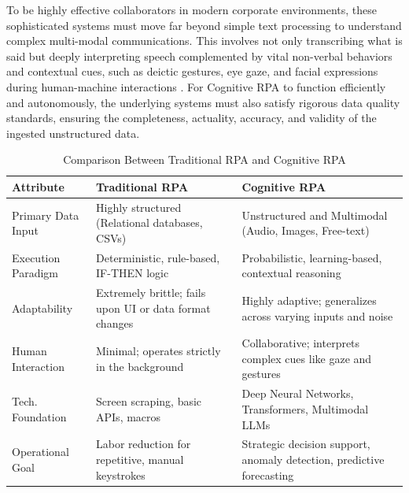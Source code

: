 To be highly effective collaborators in modern corporate environments, these sophisticated systems must move far beyond simple text processing to understand complex multi-modal communications. This involves not only transcribing what is said but deeply interpreting speech complemented by vital non-verbal behaviors and contextual cues, such as deictic gestures, eye gaze, and facial expressions during human-machine interactions \parencite{kephart2021multimodal}. For Cognitive RPA to function efficiently and autonomously, the underlying systems must also satisfy rigorous data quality standards, ensuring the completeness, actuality, accuracy, and validity of the ingested unstructured data.

\begin{table}[htbp]
\centering
\caption{Comparison Between Traditional RPA and Cognitive RPA}
\label{tab:rpa_comparison}
\begin{tabularx}{\textwidth}{@{} l >{\raggedright\arraybackslash}X >{\raggedright\arraybackslash}X @{}}
\toprule
\textbf{Attribute} & \textbf{Traditional RPA} & \textbf{Cognitive RPA} \\
\midrule
Primary Data Input & Highly structured (Relational databases, CSVs) & Unstructured and Multimodal (Audio, Images, Free-text) \\
\addlinespace
Execution Paradigm & Deterministic, rule-based, IF-THEN logic & Probabilistic, learning-based, contextual reasoning \\
\addlinespace
Adaptability & Extremely brittle; fails upon UI or data format changes & Highly adaptive; generalizes across varying inputs and noise \\
\addlinespace
Human Interaction & Minimal; operates strictly in the background & Collaborative; interprets complex cues like gaze and gestures \\
\addlinespace
Tech. Foundation & Screen scraping, basic APIs, macros & Deep Neural Networks, Transformers, Multimodal LLMs \\
\addlinespace
Operational Goal & Labor reduction for repetitive, manual keystrokes & Strategic decision support, anomaly detection, predictive forecasting \\
\bottomrule
\end{tabularx}
\end{table}

